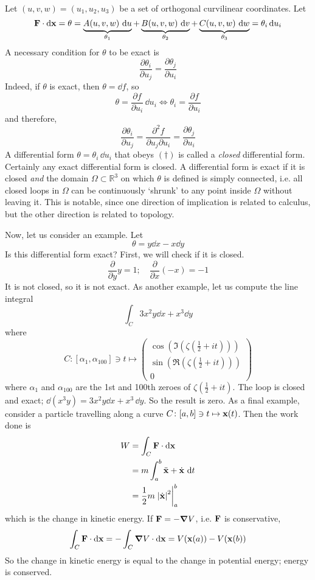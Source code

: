 \documentclass{article}
\begin{document}
Let $(u, v, w) = (u_1, u_2, u_3)$ be a set of orthogonal curvilinear coordinates. Let
\[ \vb F \cdot \dd \vb x = \theta = \underbrace{A(u, v, w) \, \dd{u}}_{\theta_1} + \underbrace{B(u, v, w) \, \dd{v}}_{\theta_2} + \underbrace{C(u, v, w) \, \dd{w}}_{\theta_3} = \theta_i \dd{u}_i \]
A necessary condition for $\theta$ to be exact is
\begin{equation}
	\frac{\partial \theta_i}{\partial u_j} = \frac{\partial \theta_j}{\partial u_i}
	\tag{$\dagger$}
\end{equation}
Indeed, if $\theta$ is exact, then $\theta = \dd{f}$, so
\[ \theta = \frac{\partial f}{\partial u_i} \, \dd{u}_i \iff \theta_i = \frac{\partial f}{\partial u_i} \]
and therefore,
\[ \frac{\partial \theta_i}{\partial u_j} = \frac{\partial^2 f}{\partial u_j \partial u_i} = \frac{\partial \theta_j}{\partial u_i} \]
A differential form $\theta = \theta_i \, \dd{u}_i$ that obeys $(\dagger)$ is called a \textit{closed} differential form. Certainly any exact differential form is closed. A differential form is exact if it is closed \textit{and} the domain $\Omega \subset \mathbb R^3$ on which $\theta$ is defined is simply connected, i.e. all closed loops in $\Omega$ can be continuously `shrunk' to any point inside $\Omega$ without leaving it. This is notable, since one direction of implication is related to calculus, but the other direction is related to topology.

Now, let us consider an example. Let
\[ \theta = y \dd{x} - x \dd{y} \]
Is this differential form exact? First, we will check if it is closed.
\[ \frac{\partial}{\partial y} y = 1;\quad \frac{\partial}{\partial x} (-x) = -1 \]
It is not closed, so it is not exact. As another example, let us compute the line integral
\[ \int_C 3x^2y\dd{x} + x^3\dd{y} \]
where
\[ C \colon [\alpha_1, \alpha_{100}] \ni t \mapsto \begin{pmatrix}
		\cos \left( \Im \left( \zeta \left( \frac{1}{2} + it \right) \right) \right) \\
		\sin \left( \Re \left( \zeta \left( \frac{1}{2} + it \right) \right) \right) \\
		0
	\end{pmatrix} \]
where $\alpha_1$ and $\alpha_{100}$ are the 1st and 100th zeroes of $\zeta \left( \frac{1}{2} + it \right)$. The loop is closed and exact; $\dd(x^3 y) = 3x^2 y \dd{x} + x^3 \, \dd{y}$. So the result is zero. As a final example, consider a particle travelling along a curve $C \colon [a, b] \ni t \mapsto \vb x(t)$. Then the work done is
\begin{align*}
	W & = \int_C \vb F \cdot \dd \vb x                    \\
	  & = m \int_a^b \ddot{\vb x} + \dot{\vb x} \, \dd{t} \\
	  & = \frac{1}{2}m \eval{\abs{\dot{\vb x}}^2}_a^b
\end{align*}
which is the change in kinetic energy. If $\vb F = -\grad V$, i.e. $\vb F$ is conservative,
\[ \int_C \vb F \cdot \dd \vb x = -\int_C \grad V \cdot \dd \vb x = V(\vb x(a)) - V(\vb x(b)) \]
So the change in kinetic energy is equal to the change in potential energy; energy is conserved.
\end{document}
